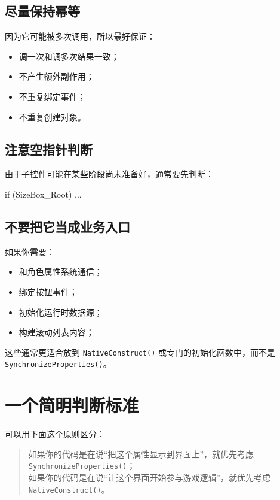 \documentclass[10pt,CJKmath]{ctexart}
\begin{document}
\subsection{尽量保持幂等}

因为它可能被多次调用，所以最好保证：

\begin{itemize}
	\item 调一次和调多次结果一致；
	\item 不产生额外副作用；
	\item 不重复绑定事件；
	\item 不重复创建对象。
\end{itemize}

\subsection{注意空指针判断}

由于子控件可能在某些阶段尚未准备好，通常要先判断：

\begin{code}
	if (SizeBox_Root)
	{
		...
	}
\end{code}

\subsection{不要把它当成业务入口}

如果你需要：

\begin{itemize}
	\item 和角色属性系统通信；
	\item 绑定按钮事件；
	\item 初始化运行时数据源；
	\item 构建滚动列表内容；
\end{itemize}

这些通常更适合放到 \texttt{NativeConstruct()} 或专门的初始化函数中，而不是 \texttt{SynchronizeProperties()}。

\section{一个简明判断标准}

可以用下面这个原则区分：

\begin{quote}
	如果你的代码是在说“把这个属性显示到界面上”，就优先考虑 \texttt{SynchronizeProperties()}；\\
	如果你的代码是在说“让这个界面开始参与游戏逻辑”，就优先考虑 \texttt{NativeConstruct()}。
\end{quote}
\end{document}
